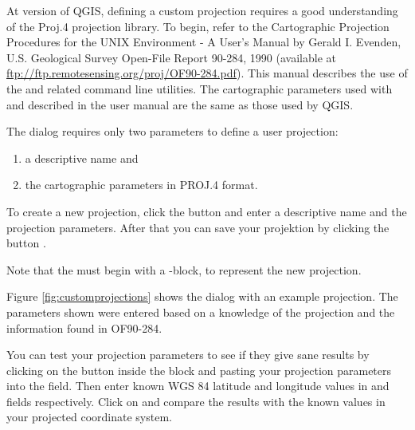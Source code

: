 At version \CURRENT of QGIS, defining a custom projection requires a good
understanding of the Proj.4 projection library. To begin, refer to the
Cartographic Projection Procedures for the UNIX Environment - A User's Manual
by Gerald I. Evenden, U.S. Geological Survey Open-File Report 90-284, 1990
(available at \url{ftp://ftp.remotesensing.org/proj/OF90-284.pdf}).
This manual describes the use of the  and related command line
utilities. The cartographic parameters used with  and described
in the user manual are the same as those used by QGIS. 

The  dialog requires
only two parameters to define a user projection: 
\begin{enumerate}
\item a descriptive name and
\item the cartographic parameters in PROJ.4 format.
\end{enumerate}
To create a new projection, click the 
 button and enter a descriptive
name and the projection parameters. 
After that you can save your projektion by clicking the button
.

Note that the  must begin with a -block,
to represent the new projection.

Figure \ref{fig:customprojections} shows
the dialog with an example projection. The parameters shown were entered based
on a knowledge of the projection and the information found in OF90-284.

You can test your projection parameters to see if they give sane results by
clicking on the  button inside the  block 
and pasting your projection parameters into
the  field. Then enter known WGS 84 latitude and longitude
values in  and  fields respectively. 
Click on  and compare the results with the known values in your projected coordinate
system. 

